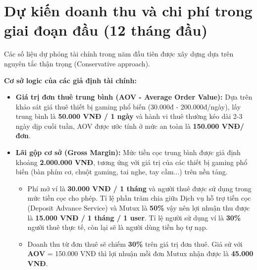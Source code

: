 \section{Dự kiến doanh thu và chi phí trong giai đoạn đầu (12 tháng đầu)}
Các số liệu dự phóng tài chính trong năm đầu tiên được xây dựng dựa trên nguyên tắc thận trọng (Conservative approach).

\textbf{Cơ sở logic của các giả định tài chính:}
\begin{itemize}
    \item \textbf{Giá trị đơn thuê trung bình (AOV - Average Order Value):} Dựa trên khảo sát giá thuê thiết bị gaming phổ biến (30.000đ - 200.000đ/ngày), lấy trung bình là \textbf{50.000 VNĐ / 1 ngày} và hành vi thuê thường kéo dài 2-3 ngày dịp cuối tuần, AOV được ước tính ở mức an toàn là \textbf{150.000 VNĐ/đơn}.
    \item \textbf{Lãi gộp cơ sở (Gross Margin):} Mức tiền cọc trung bình được giả định khoảng \textbf{2.000.000 VNĐ}, tương ứng với giá trị của các thiết bị gaming phổ biến (bàn phím cơ, chuột gaming, tai nghe, tay cầm...) trên nền tảng. 
    \begin{itemize}
        \item Phí mở ví là \textbf{30.000 VNĐ / 1 tháng} và người thuê được sử dụng trong mức tiền cọc cho phép. Tỉ lệ phần trăm chia giữa Dịch vụ hỗ trợ tiền cọc (Deposit Advance Service) và Mutux là \textbf{50\%} vậy nên lợi nhuận thu được là \textbf{15.000 VNĐ / 1 tháng / 1 user}. Tỉ lệ người sử dụng ví là \textbf{30\%} người thuê thực tế, còn lại sẽ là người dùng tiền họ tự nạp.
        \item Doanh thu từ đơn thuê sẽ chiếm \textbf{30\%} trên giá trị đơn thuê. Giả sử với \textbf{AOV} = 150.000 VNĐ thì lợi nhuận mỗi đơn Mutux nhận được là \textbf{45.000 VNĐ}.
    \end{itemize}
\end{itemize}

